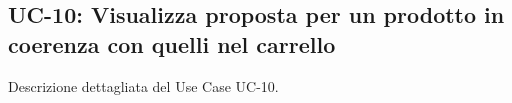 \subsection{UC-10: Visualizza proposta per un prodotto in coerenza con quelli nel carrello}

Descrizione dettagliata del Use Case UC-10.
